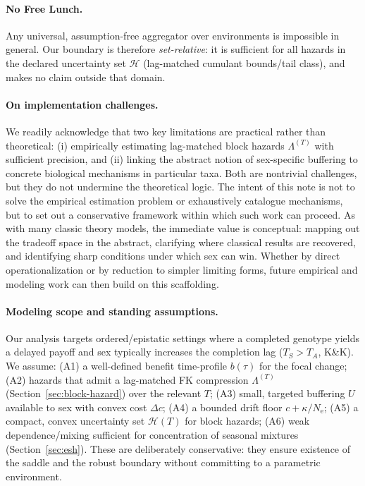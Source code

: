 \documentclass[11pt]{article}
\theoremstyle{upright}
\newcommand{\Ne}{N_{\mathrm{e}}}
\newcommand{\Hset}{\mathcal{H}}
\newcommand{\hazT}[1]{\Lambda^{(#1)}}          %
\begin{document}
\paragraph{No Free Lunch.}
Any universal, assumption-free aggregator over environments is impossible in general. Our boundary is therefore \emph{set-relative}: it is sufficient for all
hazards in the declared uncertainty set $\Hset$ (lag-matched cumulant bounds/tail class), and makes no claim outside that domain.

\paragraph{On implementation challenges.}
We readily acknowledge that two key limitations are practical rather than theoretical: (i) empirically estimating lag-matched block hazards $\hazT{T}$ with sufficient precision, and (ii) linking the abstract notion of sex-specific buffering to concrete biological mechanisms in particular taxa. Both are nontrivial challenges, but they do not undermine the theoretical logic. The intent of this note is not to solve the empirical estimation problem or exhaustively catalogue mechanisms, but to set out a conservative framework within which such work can proceed. As with many classic theory models, the immediate value is conceptual: mapping out the tradeoff space in the abstract, clarifying where classical results are recovered, and identifying sharp conditions under which sex can win. Whether by direct operationalization or by reduction to simpler limiting forms, future empirical and modeling work can then build on this scaffolding.

\paragraph{Modeling scope and standing assumptions.}
Our analysis targets ordered/epistatic settings where a completed genotype yields a delayed payoff and sex typically increases the completion lag ($T_S>T_A$, K\&K). We assume: (A1) a well-defined benefit time-profile $b(\tau)$ for the focal change; (A2) hazards that admit a lag-matched FK compression $\hazT{T}$ (Section~\ref{sec:block-hazard}) over the relevant $T$; (A3) small, targeted buffering $U$ available to sex with convex cost $\Delta c$; (A4) a bounded drift floor $c+\kappa/\Ne$; (A5) a compact, convex uncertainty set $\mathcal H(T)$ for block hazards; (A6) weak dependence/mixing sufficient for concentration of seasonal mixtures (Section~\ref{sec:esh}). These are deliberately conservative: they ensure existence of the saddle and the robust boundary without committing to a parametric environment.
\end{document}
